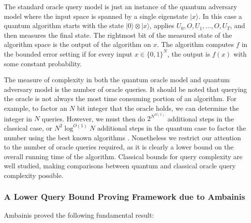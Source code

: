 The standard oracle query model is just an instance of the quantum
adversary model where the input space is spanned by a single
eigenstate $|x\rangle$.  In this case a quantum algorithm starts with
the state $|0\rangle \otimes |x\rangle$, applies $U_{0}, O, U_{1},
\ldots, O, U_{T}$, and then measures the final state.  The rightmost
bit of the measured state of the algorithm space is the output of the
algorithm on $x$.  The algorithm computes $f$ in the bounded error
setting if for every input $x \in \{0,1\}^{N}$, the output is $f(x)$
with some constant probability.

The measure of complexity in both the quantum oracle model and quantum
adversary model is the number of oracle queries.  It should be noted
that querying the oracle is not always the most time consuming portion
of an algorithm.  For example, to factor an $N$ bit integer that the
oracle holds, we can determine the integer in $N$ queries.  However,
we must then do $2^{N^{\Omega(1)}}$ additional steps in the classical
case, or $N^{2}\log^{O(1)}{N}$ additional steps in the quantum case to
factor the number using the best known algorithms
\cite{beals98quantum}. Nonetheless we restrict our attention to the 
number of oracle queries required, as it is clearly a lower bound on
the overall running time of the algorithm.  Classical bounds for query
complexity are well studied, making comparisons between quantum and
classical oracle query complexity possible.

\subsubsection{A Lower Query Bound Proving Framework due to Ambainis} 

Ambainis \cite{ambainis00quantum} proved the following fundamental
result:

